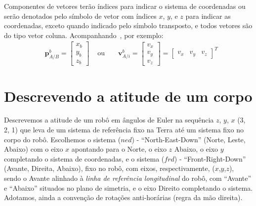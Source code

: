 Componentes de vetores terão índices para indicar o sistema de coordenadas ou serão denotados pelo símbolo de vetor com índices \(x\), \(y\), e \(z\) para indicar as coordenadas, exceto quando indicado pelo símbolo transposto, e todos vetores são do tipo vetor coluna. Acompanhando~\cite{Stevens2016}, por exemplo:
\begin{align*}
    &\mathbf{p}^{b}_{A/B} = \begin{bmatrix}x_{b} \\ y_{b} \\ z_{b}\end{bmatrix}&
    \text{ ou }&
    &\mathbf{v}^{b}_{A/i} = \begin{bmatrix} v_{x} \\ v_{y} \\ v_{z} \end{bmatrix} = \begin{bmatrix} v_{x} & v_{y} & v_{z} \end{bmatrix}^{T}
\end{align*}


\section{Descrevendo a atitude de um corpo}

Descrevemos a atitude de um robô em ângulos de Euler na sequência \(z\), \(y\), \(x\) (3, 2, 1) que leva de um sistema de referência fixo na Terra até um sistema fixo no corpo do robô. Escolhemos o sistema (\(ned\)) - ``North-East-Down'' (Norte, Leste, Abaixo) com o eixo \(x\) apontando para o Norte, o eixo \(z\) Abaixo, o eixo \(y\) completando o sistema de coordenadas, e o sistema (\(frd\)) - ``Front-Right-Down'' (Avante, Direita, Abaixo), fixo no robô, com eixos, respectivamente, (\(x\),\(y\),\(z\)), sendo o Avante alinhado à \emph{linha de referência longitudinal} do robô, com ``Avante'' e ``Abaixo'' situados no plano de simetria, e o eixo Direito completando o sistema. Adotamos, ainda a convenção de rotações anti-horárias (regra da mão direita).

